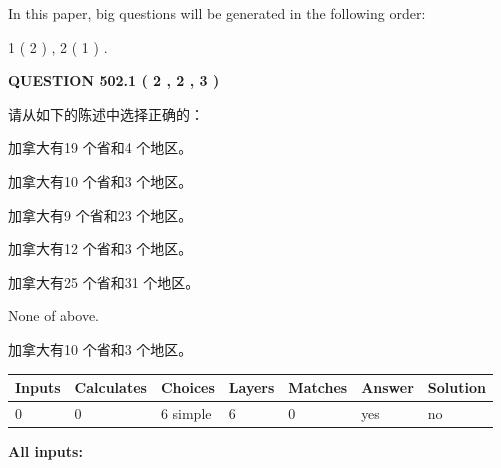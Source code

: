 \documentclass{ctexart}
\begin{document}
   
   
\vspace{0.2in}
   
In this paper, big questions will be generated in the following order: 
   
   
   1 ( 2 )
 ,
   2 ( 1 )
 .
  
\vspace{0.2in}
  
{\textbf{\Large{QUESTION
502.1 
 ( 2 , 2 , 3 )
}}}
  
  
请从如下的陈述中选择正确的：
 
 
加拿大有19 个省和4 个地区。
 
 
加拿大有10 个省和3 个地区。
 
 
加拿大有9 个省和23 个地区。
 
 
加拿大有12 个省和3 个地区。
 
 
加拿大有25 个省和31 个地区。
 
 
 None of above.
 
 
\noindent{}
 
 
加拿大有10 个省和3 个地区。
 
 
\noindent{}
 
 
   
   
   
   
\noindent\begin{tabular}{|l|l|l|l|l|l|l|}
 \hline
Inputs & Calculates & Choices & Layers & Matches & Answer & Solution \\ \hline
 0  & 
 0  & 
 6
  simple  
  & 
 6  & 
 0  & 
  yes & 
  no 
  \\ \hline
 \end{tabular}
   
   
   
   
\noindent{}
   
   
   
   
\noindent\vspace{0.1in}\hspace{-0.08in} {\textbf{\Large{All inputs: }}}
   
\end{document}
